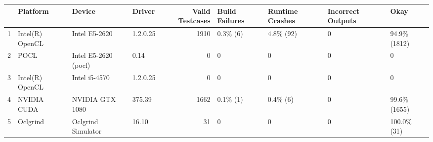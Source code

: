 \begin{tabular}{llllrllll}
\toprule
{} &         Platform &                Device &    Driver &  Valid Testcases & Build Failures & Runtime Crashes & Incorrect Outputs &          Okay \\
\midrule
1 &  Intel(R) OpenCL &         Intel E5-2620 &  1.2.0.25 &             1910 &       0.3\% (6) &       4.8\% (92) &                 0 &  94.9\% (1812) \\
2 &             POCL &  Intel E5-2620 (pocl) &      0.14 &                0 &              0 &               0 &                 0 &             0 \\
3 &  Intel(R) OpenCL &         Intel i5-4570 &  1.2.0.25 &                0 &              0 &               0 &                 0 &             0 \\
4 &      NVIDIA CUDA &       NVIDIA GTX 1080 &    375.39 &             1662 &       0.1\% (1) &        0.4\% (6) &                 0 &  99.6\% (1655) \\
5 &         Oclgrind &    Oclgrind Simulator &     16.10 &               31 &              0 &               0 &                 0 &   100.0\% (31) \\
\bottomrule
\end{tabular}
